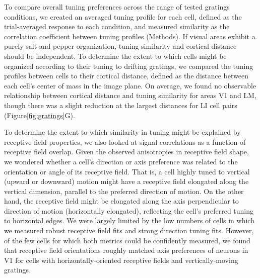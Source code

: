 To compare overall tuning preferences across the range of tested gratings conditions, we created an averaged tuning profile for each cell, defined as the trial-averaged response to each condition, and measured similarity as the correlation coefficient between tuning profiles (Methods). If visual areas exhibit a purely salt-and-pepper organization, tuning similarity and cortical distance should be independent. To determine the extent to which cells might be organized according to their tuning to drifting gratings, we compared the tuning profiles between cells to their cortical distance, defined as the distance between each cell’s center of mass in the image plane. On average, we found no observable relationship between cortical distance and tuning similarity for areas V1 and LM, though there was a slight reduction at the largest distances for LI cell pairs (Figure\ref{fig:gratings}G). 

To determine the extent to which similarity in tuning might be explained by receptive field properties, we also looked at signal correlations as a function of receptive field overlap. Given the observed anisotropies in receptive field shape, we wondered whether a cell's direction or axis preference was related to the orientation or angle of its receptive field. That is, a cell highly tuned to vertical (upward or downward) motion might have a receptive field elongated along the vertical dimension, parallel to the preferred direction of motion. On the other hand, the receptive field might be elongated along the axis perpendicular to direction of motion (horizontally elongated), reflecting the cell's preferred tuning to horizontal edges. We were largely limited by the low numbers of cells in which we measured robust receptive field fits and strong direction tuning fits. However, of the few cells for which both metrics could be confidently measured, we found that receptive field orientations roughly matched axis preferences of neurons in V1 for cells with horizontally-oriented receptive fields and vertically-moving gratings. 





